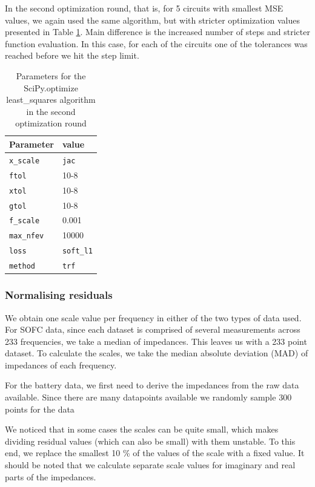 \documentclass[
    11pt,
    a4paper,
    oneside
]{article}
\begin{document}
In the second optimization round, that is, for 5 circuits with smallest MSE values, we again used the same algorithm, but with stricter
optimization values presented in Table \ref{parsopt2}. Main difference is the increased number of steps and stricter function evaluation.
In this case, for each of the circuits one of the tolerances was reached before we hit the step limit.
\begin{table}[]
\centering
\begin{tabular}{l|l}
Parameter & value \\ \hline
\texttt{x\_scale} & \texttt{jac} \\
\texttt{ftol} &  10{-8}\\
\texttt{xtol} &  10{-8}\\
\texttt{gtol} &  10{-8}\\
\texttt{f\_scale} &  0.001\\
\texttt{max\_nfev} &  10000\\
\texttt{loss} &  \texttt{soft\_l1}\\
\texttt{method} & \texttt{trf}
\end{tabular}
\caption{Parameters for the SciPy.optimize least\_squares algorithm in the second optimization round}
\label{parsopt2}
\end{table}

\subsubsection{Normalising residuals}\label{normalisation}

We obtain one scale value per frequency in either of the two types of data used. For SOFC data, since each dataset is comprised of
several measurements across 233 frequencies, we take a median of impedances. This leaves us with a 233 point dataset. To calculate the scales, we
take the median absolute deviation (MAD) of impedances of each frequency.

For the battery data, we first need to derive the impedances from the raw data available. Since there are many datapoints available we randomly
sample 300 points for the data

We noticed that in some cases the scales can be quite small, which makes dividing residual values (which can also be small) with them unstable.
To this end, we replace the smallest 10 \% of the values of the scale with a fixed value. It should be noted that we calculate separate scale values
for imaginary and real parts of the impedances.
\end{document}
